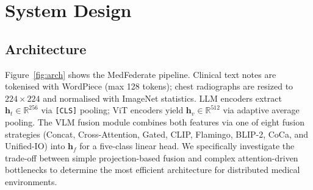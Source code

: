 \documentclass[conference]{IEEEtran}
\begin{document}
\section{System Design}

\subsection{Architecture}

Figure~\ref{fig:arch} shows the MedFederate pipeline. Clinical text
notes are tokenised with WordPiece (max 128 tokens); chest radiographs
are resized to $224{\times}224$ and normalised with ImageNet
statistics. LLM encoders extract
$\mathbf{h}_t\!\in\!\mathbb{R}^{256}$ via \texttt{[CLS]} pooling;
ViT encoders yield $\mathbf{h}_v\!\in\!\mathbb{R}^{512}$ via adaptive
average pooling. The VLM fusion module combines both features via one of
eight fusion strategies (Concat, Cross-Attention, Gated, CLIP, Flamingo,
BLIP-2, CoCa, and Unified-IO) into $\mathbf{h}_f$ for a five-class linear head.
We specifically investigate the trade-off between simple projection-based
fusion and complex attention-driven bottlenecks to determine the most
efficient architecture for distributed medical environments.
\end{document}
